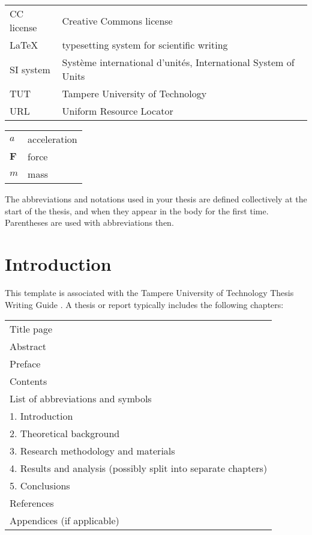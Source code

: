 \documentclass[twoside,draftfooter]{tutthesis} %
\begin{document}

\begin{tabular}[h]{@{} p{} p{} @{}}
CC license & Creative Commons license \\
LaTeX & typesetting system for scientific writing \\
SI system & Système international d'unités, International System of Units \\
TUT & Tampere University of Technology \\
URL & Uniform Resource Locator 
\end{tabular}

\begin{tabular}[h]{@{} p{} p{} @{}}
$a$ & acceleration \\
$\mathbf{F}$ & force \\
$m$ & mass
\end{tabular}

The abbreviations and notations used in your thesis are defined collectively at the start of the thesis, and when they appear in the body for the first time.
Parentheses are used with abbreviations then.



\chapter{Introduction}
\label{ch:Introduction}

This template is associated with the Tampere University of Technology Thesis Writing Guide \citep{Tut2017}.
A thesis or report typically includes the following chapters:

\begin{tabular}[h]{l}
Title page\\
Abstract\\

Preface\\
Contents\\
List of abbreviations and symbols\\
1. Introduction\\
2. Theoretical background\\
3. Research methodology and materials\\
4. Results and analysis (possibly split into separate chapters) \\
5. Conclusions\\
References\\
Appendices (if applicable)
\end{tabular}
\end{document}
